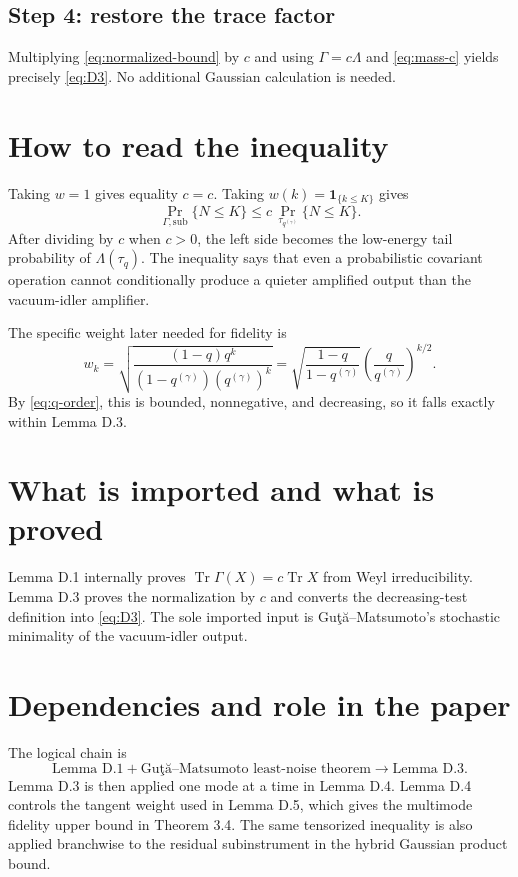 \documentclass[11pt]{article}
\newcommand{\Tr}{\operatorname{Tr}}
\begin{document}
\subsection*{Step 4: restore the trace factor}

Multiplying \eqref{eq:normalized-bound} by $c$ and using
$\Gamma=c\Lambda$ and \eqref{eq:mass-c} yields precisely \eqref{eq:D3}.
No additional Gaussian calculation is needed.

\section{How to read the inequality}

Taking $w=1$ gives equality $c=c$.  Taking
$w(k)=\boldsymbol 1_{\{k\leq K\}}$ gives
\[
  \Pr_{\Gamma,\mathrm{sub}}\{N\leq K\}
  \leq c\,\Pr_{\tau_{q^{(\gamma)}}}\{N\leq K\}.
\]
After dividing by $c$ when $c>0$, the left side becomes the low-energy tail
probability of $\Lambda(\tau_q)$.  The inequality says that even a
probabilistic covariant operation cannot conditionally produce a quieter
amplified output than the vacuum-idler amplifier.

The specific weight later needed for fidelity is
\[
  w_k=\sqrt{\frac{(1-q)q^k}
                       {(1-q^{(\gamma)})(q^{(\gamma)})^k}}
  =\sqrt{\frac{1-q}{1-q^{(\gamma)}}}
   \left(\frac{q}{q^{(\gamma)}}\right)^{k/2}.
\]
By \eqref{eq:q-order}, this is bounded, nonnegative, and decreasing, so it
falls exactly within Lemma D.3.

\section{What is imported and what is proved}

Lemma D.1 internally proves $\Tr\Gamma(X)=c\Tr X$ from Weyl
irreducibility.  Lemma D.3 proves the normalization by $c$ and converts the
decreasing-test definition into \eqref{eq:D3}.  The sole imported input is
Gu\c{t}\u{a}--Matsumoto's stochastic minimality of the vacuum-idler output.

\section{Dependencies and role in the paper}

The logical chain is
\[
  \text{Lemma D.1}
  +\text{Gu\c{t}\u{a}--Matsumoto least-noise theorem}
  \longrightarrow \text{Lemma D.3}.
\]
Lemma D.3 is then applied one mode at a time in Lemma D.4.  Lemma D.4
controls the tangent weight used in Lemma D.5, which gives the multimode
fidelity upper bound in Theorem 3.4.  The same tensorized inequality is also
applied branchwise to the residual subinstrument in the hybrid Gaussian
product bound.
\end{document}
